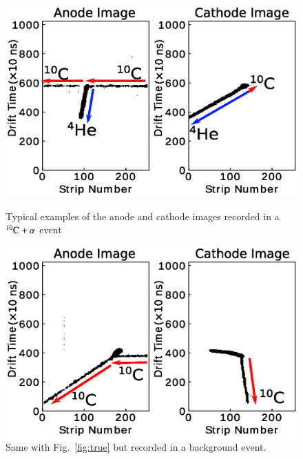 \documentclass{jps-cp}
\begin{document}
\begin{figure}
  \centering
  \begin{minipage}{0.45\columnwidth}
    \centering
    \includegraphics[clip, width=0.9\columnwidth]{eps/true.eps}
    \caption{Typical examples of the anode and cathode images recorded in a ${}^{10}\rm{C}+\alpha$ event}
    \label{fig:true}
  \end{minipage}
  \hfill
  \begin{minipage}{0.45\columnwidth}
    \centering
    \includegraphics[clip, width=0.9\columnwidth]{eps/false.eps}
    \caption{Same with Fig.~\ref{fig:true} but recorded in a background event.}
    \label{fig:false}
  \end{minipage}
\end{figure}
\end{document}
